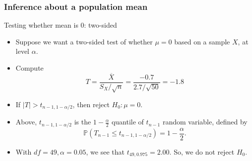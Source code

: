 \documentclass[handout]{beamer}
\newcommand{\Pp}{\mathbb{P}}
\begin{document}

   \begin{frame} \frametitle{Inference about a population mean}

   \begin{block}
   {Testing whether mean is 0: two-sided}
   \begin{itemize}
   \item  Suppose we want a two-sided test of whether $\mu=0$ based
   on a sample $X$, at level $\alpha$.
   \item Compute
   $$
   T = \frac{\overline{X}}{S_X/\sqrt{n}} = \frac{-0.7}{2.7/\sqrt{50}}=-1.8$$
   \item If $|T| > t_{n-1, 1-\alpha/2}$, then reject $H_0:\mu=0$.
   \item Above, $t_{n-1, 1-\alpha/2}$ is the $1-\frac \alpha 2$ quantile of $t_{n-1}$ random variable, defined by
   $$
   \Pp(T_{n-1} \leq t_{n-1,1-\alpha/2}) = 1 - \frac\alpha 2.$$

   \item With $df=49, \alpha=0.05$, we see that $t_{49,0.975}=2.00$. So,
   we do not reject $H_0$.
   \end{itemize}
   \end{block}
   \end{frame}

\end{document}

